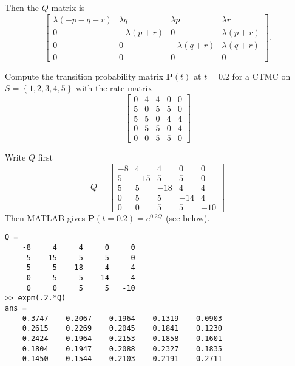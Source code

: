 \documentclass[  11pt]{article}
\newcommand{\Pm}{{\mathbf{P}}}
\newcommand{\set}[1]{\left\{#1\right\}}
\begin{document}
\begin{ExerciseList}
Then the $Q$ matrix is  
\[
\begin{bmatrix}
\lambda(-p-q-r) &\lambda q & \lambda p & \lambda r \\
0 & -\lambda (p+r)  & 0 & \lambda (p+r) \\
0 & 0 & -\lambda (q+r) & \lambda (q+r) \\
0 & 0 & 0& 0
\end{bmatrix}.
\] 
%
%

\Exercise[origin={4.1, p 141}]
Compute the transition probability matrix $\Pm(t)$ at $t=0.2$ for a CTMC on
$S=\set{1,2,3,4,5}$ with the rate matrix
\[ \begin{bmatrix}
0 & 4& 4& 0& 0\\
5 & 0 & 5& 5& 0 
\\
5 &5& 0& 4& 4
\\
 0 &5 &5 &0& 4
 \\
  0&0&5&5&0
\end{bmatrix}
\]

\Answer 
Write $Q$ first 
\[Q= \begin{bmatrix}
-8 & 4& 4& 0& 0\\
5 & -15 & 5& 5& 0 
\\
5 &5& -18 & 4& 4
\\
 0 &5 &5 &-14& 4
 \\
  0&0&5&5&-10
\end{bmatrix}
\]
Then MATLAB gives 
$\Pm(t=0.2) = e^{0.2Q} $ (see below).

\begin{lstlisting}
Q =
    -8     4     4     0     0
     5   -15     5     5     0
     5     5   -18     4     4
     0     5     5   -14     4
     0     0     5     5   -10
>> expm(.2.*Q)
ans =
    0.3747    0.2067    0.1964    0.1319    0.0903
    0.2615    0.2269    0.2045    0.1841    0.1230
    0.2424    0.1964    0.2153    0.1858    0.1601
    0.1804    0.1947    0.2088    0.2327    0.1835
    0.1450    0.1544    0.2103    0.2191    0.2711
\end{lstlisting}



\Exercise[origin={4.4, p 141}]


\end{ExerciseList}
\end{document}
